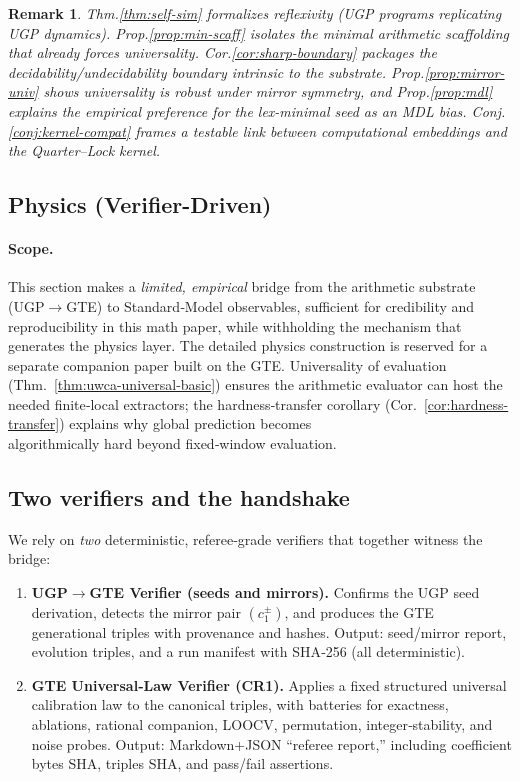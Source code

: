 \documentclass[12pt]{article}
\newtheorem{remark}[theorem]{Remark}
\numberwithin{equation}{section}
\begin{document}
\begin{remark}
Thm.\ref{thm:self-sim} formalizes reflexivity (UGP programs replicating UGP dynamics). Prop.\ref{prop:min-scaff} isolates the minimal arithmetic scaffolding that already forces universality. Cor.\ref{cor:sharp-boundary} packages the decidability/undecidability boundary intrinsic to the substrate. Prop.\ref{prop:mirror-univ} shows universality is robust under mirror symmetry, and Prop.\ref{prop:mdl} explains the empirical preference for the lex-minimal seed as an MDL bias. Conj.\ref{conj:kernel-compat} frames a testable link between computational embeddings and the Quarter–Lock kernel.
\end{remark}


\subsection{Physics (Verifier-Driven)}\label{sec:physics-bridge}

\paragraph{Scope.}
This section makes a \emph{limited, empirical} bridge from the arithmetic substrate (UGP$\to$GTE) to Standard‑Model observables, sufficient for credibility and reproducibility in this math paper, while withholding the mechanism that generates the physics layer. The detailed physics construction is reserved for a separate companion paper built on the GTE. Universality of evaluation (Thm.~\ref{thm:uwca-universal-basic}) ensures the arithmetic evaluator can host the needed finite‑local extractors; the hardness‑transfer corollary (Cor.~\ref{cor:hardness-transfer}) explains why global prediction becomes\\ algorithmically hard beyond fixed‑window evaluation.

\subsection{Two verifiers and the handshake}\label{subsec:physics-verifiers}
We rely on \emph{two} deterministic, referee‑grade verifiers that together witness the bridge:

\begin{enumerate}[leftmargin=1.2em]
  \item \textbf{UGP$\to$GTE Verifier (seeds and mirrors).} Confirms the UGP seed derivation, detects the mirror pair $(c_1^\pm)$, and produces the GTE generational triples with provenance and hashes. Output: seed/mirror report, evolution triples, and a run manifest with SHA‑256 (all deterministic).
  \item \textbf{GTE Universal‑Law Verifier (CR1).} Applies a fixed structured universal calibration law to the canonical triples, with batteries for exactness, ablations, rational companion, LOOCV, permutation, integer‑stability, and noise probes. Output: Markdown+JSON ``referee report,'' including coefficient bytes SHA, triples SHA, and pass/fail assertions.
\end{enumerate}
\end{document}
